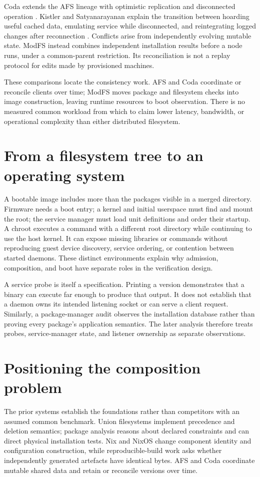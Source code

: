 Coda extends the \ac{AFS} lineage with optimistic replication and disconnected operation \autocite{satyanarayanan1990coda}. Kistler and Satyanarayanan explain the transition between hoarding useful cached data, emulating service while disconnected, and reintegrating logged changes after reconnection \autocite{kistler1992disconnected}. Conflicts arise from independently evolving mutable state. ModFS instead combines independent installation results before a node runs, under a common-parent restriction. Its reconciliation is not a replay protocol for edits made by provisioned machines.

These comparisons locate the consistency work. \ac{AFS} and Coda coordinate or reconcile clients over time; ModFS moves package and filesystem checks into image construction, leaving runtime resources to boot observation. There is no measured common workload from which to claim lower latency, bandwidth, or operational complexity than either distributed filesystem.

\section{From a filesystem tree to an operating system}
A bootable image includes more than the packages visible in a merged directory. Firmware needs a boot entry; a kernel and initial userspace must find and mount the root; the service manager must load unit definitions and order their startup. A chroot executes a command with a different root directory while continuing to use the host kernel. It can expose missing libraries or commands without reproducing guest device discovery, service ordering, or contention between started daemons. These distinct environments explain why admission, composition, and boot have separate roles in the verification design.

A service probe is itself a specification. Printing a version demonstrates that a binary can execute far enough to produce that output. It does not establish that a daemon owns its intended listening socket or can serve a client request. Similarly, a package-manager audit observes the installation database rather than proving every package's application semantics. The later analysis therefore treats probes, service-manager state, and listener ownership as separate observations.

\section{Positioning the composition problem}
The prior systems establish the foundations rather than competitors with an assumed common benchmark. Union filesystems implement precedence and deletion semantics; package analysis reasons about declared constraints and can direct physical installation tests. Nix and NixOS change component identity and configuration construction, while reproducible-build work asks whether independently generated artefacts have identical bytes. AFS and Coda coordinate mutable shared data and retain or reconcile versions over time.

